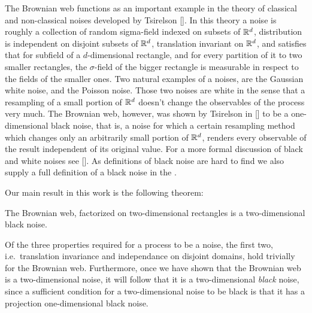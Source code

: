 {The Brownian web functions as an important example in the theory of classical
and non-classical noises developed by Tsirelson []. In this theory a noise is
roughly a collection of random sigma-field indexed on subsets of $\mathbb{R}^d$,
distribution is independent on disjoint subsets of $\mathbb{R}^d$, translation
invariant on $\mathbb{R}^d$, and satisfies that for subfield of a $d$-dimensional
rectangle, and for every partition of it to two smaller rectangles, the $\sigma$-field
of the bigger rectangle is measurable in respect to the fields of the
smaller ones. Two natural examples of a noises, are the Gaussian white noise,
and the Poisson noise. Those two noises are white in the sense that a
resampling of a small portion of $\mathbb{R}^d$ doesn't change the observables of the
process very much. The Brownian web, however, was shown by Tsirelson in [] to
be a one-dimensional black noise, that is, a noise for which a certain
resampling method which changes only an arbitrarily small portion of $\mathbb{R}^d$,
renders every observable of the result independent of its original value. For
a more formal discussion of black and white noises see []. As definitions of
black noise are hard to find we also supply a full definition of a black
noise in the .

Our main result in this work is the following theorem:

\begin{theorem}
\label{thm:bw-2d-black-noise}
The Brownian web, factorized on two-dimensional rectangles is a
two-dimensional black noise.
\end{theorem}

Of the three properties required for a process to be a noise, the
first two, i.e.\ translation invariance and independance on disjoint
domains, hold trivially for the Brownian web.  Furthermore, once we
have shown that the Brownian web is a two-dimensional noise, it will
follow that it is a two-dimensional \emph{black} noise, since a
sufficient condition for a two-dimensional noise to be black is that
it has a projection one-dimensional black noise.





}

